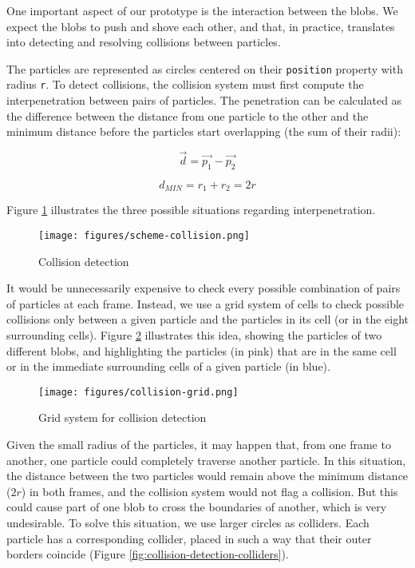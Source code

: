 \documentclass[manuscript, screen]{timtm}
\begin{document}
One important aspect of our prototype is the interaction between the blobs. We expect the blobs to push and shove each other, and that, in practice, translates into detecting and resolving collisions between particles.

The particles are represented as circles centered on their \texttt{position} property with radius \texttt{r}. To detect collisions, the collision system must first compute the interpenetration between pairs of particles. The penetration can be calculated as the difference between the distance from one particle to the other and the minimum distance before the particles start overlapping (the sum of their radii):

\[
\vec{d} = \vec{p_1} - \vec{p_2}
\]

\[
d_{MIN} = r_1 + r_2 = 2r
\]

Figure \ref{fig:collision-detection} illustrates the three possible situations regarding interpenetration.

\begin{figure}[h]
  \centering
  \texttt{[image: figures/scheme-collision.png]}
  \caption{Collision detection}
  \label{fig:collision-detection}
\end{figure}

It would be unnecessarily expensive to check every possible combination of pairs of particles at each frame. Instead, we use a grid system of cells to check possible collisions only between a given particle and the particles in its cell (or in the eight surrounding cells). Figure \ref{fig:collision-grid} illustrates this idea, showing the particles of two different blobs, and highlighting the particles (in pink) that are in the same cell or in the immediate surrounding cells of a given particle (in blue).

\begin{figure}[h]
  \centering
  \texttt{[image: figures/collision-grid.png]}
  \caption{Grid system for collision detection}
  \label{fig:collision-grid}
\end{figure}

Given the small radius of the particles, it may happen that, from one frame to another, one particle could completely traverse another particle. In this situation, the distance between the two particles would remain above the minimum distance ($2r$) in both frames, and the collision system would not flag a collision. But this could cause part of one blob to cross the boundaries of another, which is very undesirable. To solve this situation, we use larger circles as colliders. Each particle has a corresponding collider, placed in such a way that their outer borders coincide (Figure \ref{fig:collision-detection-colliders}).
\end{document}
